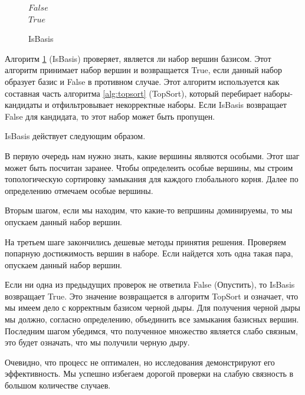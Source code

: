 \documentclass[12pt,a4paper,oneside]{article}
\theoremstyle{definition}
\theoremstyle{lemma}
\theoremstyle{remark}
\begin{document}
\begin{figure}[H]
\begin{center}
\begin{algorithm}[H]
{{{{                                    }
                                }
                            }
			}
                         {
                             {
                                \Return $False$ \\
                            }
                        }
                        \Return $True$
			\label{alg:isbasis}
			\caption{IsBasis}
		\end{algorithm}
	\end{center}
\end{figure}
\linespread{1.5}

Алгоритм \ref{alg:isbasis} (IsBasis)  проверяет, является ли набор вершин базисом. Этот алгоритм принимает набор вершин и возвращается True, если данный набор образует базис и False в противном случае. Этот алгоритм используется как составная часть алгоритма \ref{alg:topsort} (TopSort), который перебирает наборы-кандидаты и отфильтровывает некорректные наборы. Если IsBasis возвращает False для кандидата, то этот набор может быть пропущен.

IsBasis действует следующим образом.

В первую очередь нам нужно знать, какие вершины являются особыми. Этот шаг может быть посчитан заранее. Чтобы определеить особые вершины, мы строим топологическую сортировку замыкания для каждого глобального корня. Далее по определению отмечаем особые вершины.

Вторым шагом, если мы находим, что какие-то вепршины доминируемы, то мы опускаем данный набор вершин.

На третьем шаге закончились дешевые методы принятия решения. Проверяем попарную достижимость вершин в наборе. Если найдется хоть одна такая пара, опускаем данный набор вершин.

Если ни одна из предыдущих проверок не ответила False (Опустить), то IsBasis возвращает True. Это значение возвращается в алгоритм TopSort и означает, что мы имеем дело с корректным базисом черной дыры. Для получения черной дыры мы должно, согласно определению, объединить все замыкания базисных вершин. Последним шагом убедимся, что полученное множество является слабо связным, это будет означать, что мы получили черную дыру.

Очевидно, что процесс не оптимален, но исследования демонстрируют его эффективность. Мы успешно избегаем дорогой проверки на слабую связность в большом количестве случаев.
\end{document}
